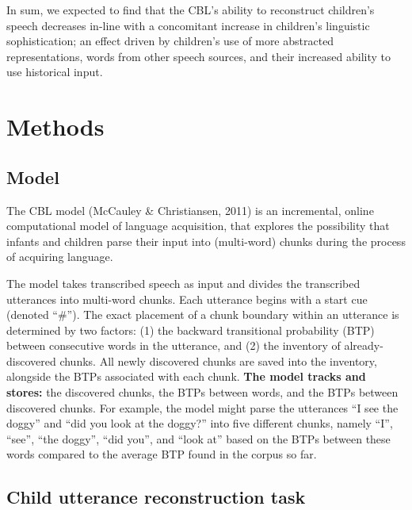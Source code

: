 \documentclass[man,mask,floatsintext]{apa6}
\begin{document}
In sum, we expected to find that the CBL's ability to reconstruct
children's speech decreases in-line with a concomitant increase in
children's linguistic sophistication; an effect driven by children's use
of more abstracted representations, words from other speech sources, and
their increased ability to use historical input.

\section{Methods}\label{methods}

\subsection{Model}\label{model}

The CBL model (McCauley \& Christiansen, 2011) is an incremental, online
computational model of language acquisition, that explores the
possibility that infants and children parse their input into
(multi-word) chunks during the process of acquiring language.

The model takes transcribed speech as input and divides the transcribed
utterances into multi-word chunks. Each utterance begins with a start
cue (denoted \enquote{\#}). The exact placement of a chunk boundary
within an utterance is determined by two factors: (1) the backward
transitional probability (BTP) between consecutive words in the
utterance, and (2) the inventory of already-discovered chunks. All newly
discovered chunks are saved into the inventory, alongside the BTPs
associated with each chunk. \textbf{The model tracks and stores:} the
discovered chunks, the BTPs between words, and the BTPs between
discovered chunks. For example, the model might parse the utterances
\enquote{I see the doggy} and \enquote{did you look at the doggy?} into
five different chunks, namely \enquote{I}, \enquote{see}, \enquote{the
doggy}, \enquote{did you}, and \enquote{look at} based on the BTPs
between these words compared to the average BTP found in the corpus so
far.

\subsection{Child utterance reconstruction
task}\label{child-utterance-reconstruction-task}
\end{document}
